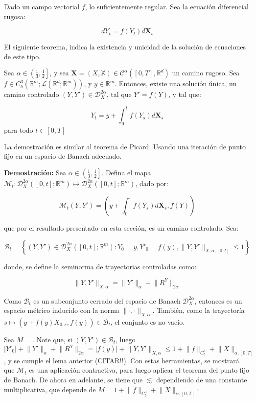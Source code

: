 Dado un campo vectorial $f$, lo suficientemente regular. Sea la ecuación diferencial rugosa:

\[
	dY_t = f(Y_t) d\mathbf{X}_t
\]

El siguiente teorema, indica la existencia y unicidad de la solución de ecuaciones de este tipo.

\begin{theorem}
	Sea $\alpha \in \left( \frac{1}{3}, \frac{1}{2} \right]$, y sea $\mathbf{X} = (X, \mathbb{X}) \in \mathscr{C}^{\alpha} ([0,T], \mathbb{R}^d)$ un camino rugoso. Sea $f \in C^3_b ( \mathbb{R}^m; \mathscr{L}( \mathbb{R}^d; \mathbb{R}^m ) )$, y $y \in \mathbb{R}^m$. Entonces, existe una solución única, un camino controlado $(Y, Y') \in \mathscr{D}^{2 \alpha}_X$, tal que $Y' = f(Y)$, y tal que:

	\[
		Y_t = y + \int_0^t f(Y_s) d\mathbf{X}_s	
	\]
	para todo $t \in [0,T]$

\end{theorem}


La demostración es similar al teorema de Picard. Usando una iteración de punto fijo en un espacio de Banach adecuado.

\textbf{Demostración:} Sea $\alpha \in \left( \frac{1}{3}, \frac{1}{2} \right]$. Defina el mapa $\mathcal{M}_t : \mathscr{D}^{2\alpha}_X ([0,t]; \mathbb{R}^m) \mapsto \mathscr{D}^{2\alpha}_X ([0,t]; \mathbb{R}^m)$, dado por:

\[
	\mathcal{M}_t (Y, Y') = \left( y + \int_0^{\cdot} f( Y_s ) d\mathbf{X}_s, f(Y)  \right)
\]


que por el resultado presentado en esta sección, es un camino controlado. Sea:

\[
	\mathcal{B}_t = \left\{  (Y, Y') \in \mathscr{D}^{2\alpha}_X ([0,t]; \mathbb{R}^m) : Y_0 = y, Y'_0 = f(y), \lVert Y, Y' \rVert_{ X, \alpha, [0,t] } \leq 1 \right\}
\]

donde, se define la seminorma de trayectorias controladas como:

\[
	\lVert Y, Y' \rVert_{X, \alpha} = \lVert  Y' \rVert_{\alpha} + \lVert R^Y \rVert_{2\alpha}
\]

Como $\mathcal{B}_t$ es un subconjunto cerrado del espacio de Banach $\mathscr{D}^{2\alpha}_X$, entonces es un espacio métrico inducido con la norma $\lVert \cdot, \cdot \rVert_{X, \alpha}$. También, como la trayectoría $s \mapsto (y + f(y)X_{0,s}, f(y)) \in \mathcal{B}_t$, el conjunto es no vacio.

Sea $M = $. Note que, si $(Y, Y') \in \mathscr{B}_t$, luego $\lvert Y'_0 \rvert + \lVert Y' \rVert_{\alpha} + \lVert R^Y \rVert_{2 \alpha} = \lvert f(y) \rvert + \lVert Y, Y' \rVert_{X, \alpha} \leq 1 + \lVert f \rVert_{C^3_b} + \lVert X \rVert_{ \alpha, [0,T] } $, y se cumple el lema anterior (CITAR!!). Con estas herramientas, se mostrará que $\mathcal{M}_t$ es una aplicación contractiva, para luego aplicar el teorema del punto fijo de Banach. De ahora en adelante, se tiene que $\lesssim$ dependiendo de una constante multiplicativa, que depende de $M = 1 + \lVert f \rVert_{C^3_b} + \lVert X \rVert_{ \alpha, [0,T] }$:

